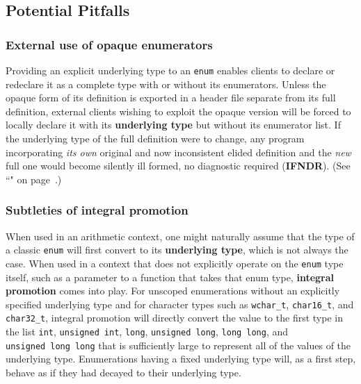 \subsection[Potential Pitfalls]{Potential Pitfalls}\label{potential-pitfalls-underlyingenum}

\subsubsection[External use of opaque enumerators]{External use of opaque enumerators}\label{external-use-of-opaque-enumerators}

Providing an explicit underlying type to an \texttt{enum} enables
clients to declare or redeclare it as a complete type with or without
its enumerators. Unless the opaque form of its definition is exported in
a header file separate from its full definition, external clients
wishing to exploit the opaque version will be forced to locally declare
it with its \textbf{underlying type} but without its enumerator list. If
the underlying type of the full definition were to change, any program
incorporating \emph{its own} original and now inconsistent elided
definition and the \emph{new} full one would become silently ill formed, no diagnostic required (\textbf{IFNDR}). (See ``" on page~\pageref{enumopaque}.)

\subsubsection[Subtleties of integral promotion]{Subtleties of integral promotion}\label{subtleties-of-integral-promotion}

When used in an arithmetic context, one might naturally assume that the
type of a classic \texttt{enum} will first convert to its
\textbf{underlying type}, which is not always the case. When used in a
context that does not explicitly operate on the \texttt{enum} type
itself, such as a parameter to a function that takes that enum type,
\textbf{integral promotion} comes into play. For unscoped enumerations
without an explicitly specified underlying type and for character types
such as \texttt{wchar\_t}, \texttt{char16\_t}, and \texttt{char32\_t},
integral promotion will directly convert the value to the first type in
the list \texttt{int}, \texttt{unsigned}~\texttt{int}, \texttt{long},
\texttt{unsigned}~\texttt{long}, \texttt{long}~\texttt{long}, and
\texttt{unsigned}~\texttt{long}~\texttt{long} that is sufficiently large
to represent all of the values of the underlying type. Enumerations
having a fixed underlying type will, as a first step, behave as if they
had decayed to their underlying type.

